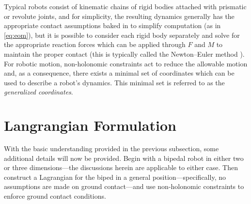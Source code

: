 
Typical robots consist of kinematic chains of rigid bodies attached with
prismatic or revolute joints, and for simplicity, the resulting dynamics
generally has the appropriate contact assumptions baked in to simplify
computation (as in \eqref{eq:eom}), but it is possible to consider
each rigid body separately and solve for the appropriate reaction forces which
can be applied through $F$ and $M$ to maintain the proper contact (this is
typically called the Newton--Euler method \cite{Hollerbach1980}).
%
For robotic motion, non-holonomic constraints act to reduce the allowable motion
and, as a consequence, there exists a minimal set of coordinates which can be
used to describe a robot's dynamics.
%
This minimal set is referred to as the {\em generalized coordinates}.


\section{Langrangian Formulation}

%
%

With the basic understanding provided in the previous subsection, some
additional details will now be provided.
%
Begin with a bipedal robot in either two or three dimensions---the discussions
herein are applicable to either case.
%
Then construct a Lagrangian for the biped in a general position---specifically,
no assumptions are made on ground contact---and use non-holonomic constraints to
enforce ground contact conditions.

